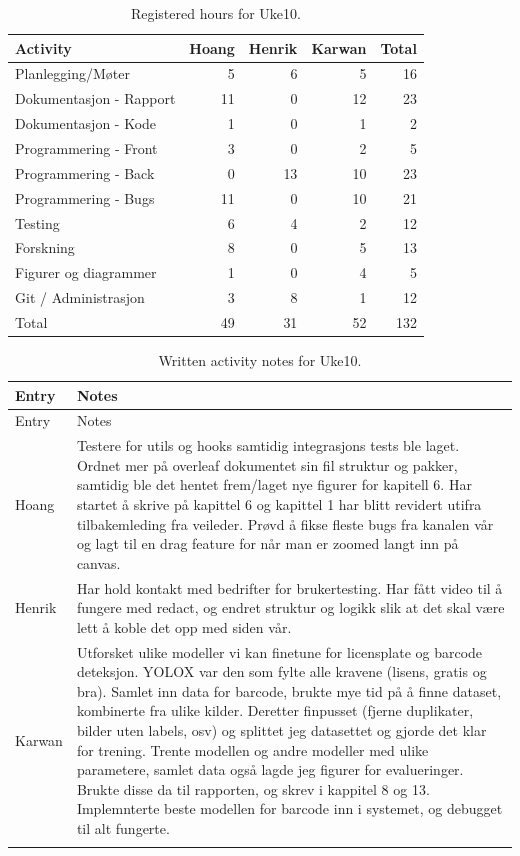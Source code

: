 \begin{table}[H]
\centering
\small
\caption{Registered hours for Uke10.}
\label{tab:project-hours-uke10}
\begin{tabular}{lrrrr}
\toprule
Activity & Hoang & Henrik & Karwan & Total \\
\midrule
Planlegging/Møter & 5 & 6 & 5 & 16 \\
Dokumentasjon - Rapport & 11 & 0 & 12 & 23 \\
Dokumentasjon - Kode & 1 & 0 & 1 & 2 \\
Programmering - Front & 3 & 0 & 2 & 5 \\
Programmering - Back & 0 & 13 & 10 & 23 \\
Programmering - Bugs & 11 & 0 & 10 & 21 \\
Testing & 6 & 4 & 2 & 12 \\
Forskning & 8 & 0 & 5 & 13 \\
Figurer og diagrammer & 1 & 0 & 4 & 5 \\
Git / Administrasjon & 3 & 8 & 1 & 12 \\
\midrule
Total & 49 & 31 & 52 & 132 \\
\bottomrule
\end{tabular}
\end{table}

\begin{longtable}{p{}p{}}
\caption{Written activity notes for Uke10.}\\
\toprule
Entry & Notes \\
\midrule
\endfirsthead
\toprule
Entry & Notes \\
\midrule
\endhead
Hoang & Testere for utils og hooks samtidig integrasjons tests ble laget. Ordnet mer på overleaf dokumentet sin fil struktur og pakker, samtidig ble det hentet frem/laget nye figurer for kapitell 6. Har startet å skrive på kapittel 6 og kapittel 1 har blitt revidert utifra tilbakemleding fra veileder. Prøvd å fikse fleste bugs fra kanalen vår og lagt til en drag feature for når man er zoomed langt inn på canvas. \\
\addlinespace
Henrik & Har hold kontakt med bedrifter for brukertesting. Har fått video til å fungere med redact, og endret struktur og logikk slik at det skal være lett å koble det opp med siden vår. \\
\addlinespace
Karwan & Utforsket ulike modeller vi kan finetune for licensplate og barcode deteksjon. YOLOX var den som fylte alle kravene (lisens, gratis og bra). Samlet inn data for barcode, brukte mye tid på å finne dataset, kombinerte fra ulike kilder. Deretter finpusset (fjerne duplikater, bilder uten labels, osv) og splittet jeg datasettet og gjorde det klar for trening. Trente modellen og andre modeller med ulike parametere, samlet data også lagde jeg figurer for evalueringer. Brukte disse da til rapporten, og skrev i kappitel 8 og 13. Implemnterte beste modellen for barcode inn i systemet, og debugget til alt fungerte. \\
\addlinespace
\bottomrule
\end{longtable}

